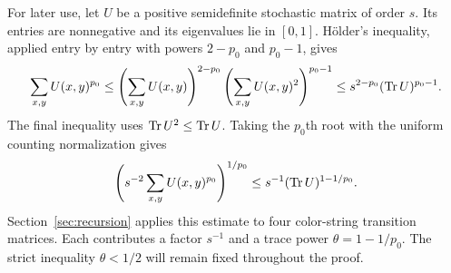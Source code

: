 For later use, let $U$ be a positive semidefinite stochastic matrix of order $s$. Its entries are nonnegative and its eigenvalues lie in $[0,1]$. H\"older's inequality, applied entry by entry with powers $2-p_0$ and $p_0-1$, gives
\begin{equation}\label{eq:interpolation}
 \sum_{x,y}U(x,y)^{p_0}
 \le\left(\sum_{x,y}U(x,y)\right)^{2-p_0}
       \left(\sum_{x,y}U(x,y)^2\right)^{p_0-1}
 \le s^{2-p_0}(\operatorname{Tr} U)^{p_0-1}.
\end{equation}
The final inequality uses $\operatorname{Tr} U^2\le\operatorname{Tr} U$. Taking the $p_0$th root with the uniform counting normalization gives
\[
 \left(s^{-2}\sum_{x,y}U(x,y)^{p_0}\right)^{1/p_0}
 \le s^{-1}(\operatorname{Tr} U)^{1-1/p_0}.
\]
Section~\ref{sec:recursion} applies this estimate to four color-string transition matrices. Each contributes a factor $s^{-1}$ and a trace power $\theta=1-1/p_0$. The strict inequality $\theta<1/2$ will remain fixed throughout the proof.
